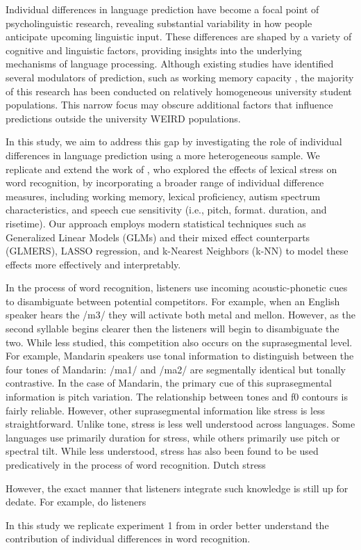 
Individual differences in language prediction have become a focal point of psycholinguistic research, revealing substantial variability in how people anticipate upcoming linguistic input. These differences are shaped by a variety of cognitive and linguistic factors, providing insights into the underlying mechanisms of language processing. Although existing studies have identified several modulators of prediction, such as working memory capacity \cite{Huettig2016,Li2023}, the majority of this research has been conducted on relatively homogeneous university student populations. This narrow focus may obscure additional factors that influence predictions outside the university WEIRD populations.

In this study, we aim to address this gap by investigating the role of individual differences in language prediction using a more heterogeneous sample. We replicate and extend the work of \citep{Sulpizio_McQueen_2012}, who explored the effects of lexical stress on word recognition, by incorporating a broader range of individual difference measures, including working memory, lexical proficiency, autism spectrum characteristics, and speech cue sensitivity (i.e., pitch, format. duration, and risetime). Our approach employs modern statistical techniques such as Generalized Linear Models (GLMs) and their mixed effect counterparts (GLMERS), LASSO regression, and k-Nearest Neighbors (k-NN) to model these effects more effectively and interpretably.

In the process of word recognition, listeners use incoming acoustic-phonetic cues to disambiguate between potential competitors. For example, when an English speaker hears the /m3/ they will activate both metal and mellon. However, as the second syllable begins clearer then the listeners will begin to disambiguate the two. While less studied, this competition also occurs on the suprasegmental level. For example, Mandarin speakers use tonal information to distinguish between the four tones of Mandarin: /ma1/ and /ma2/ are segmentally identical but tonally contrastive. 
In the case of Mandarin, the primary cue of this suprasegmental information is pitch variation. The relationship between tones and f0 contours is fairly reliable. However, other suprasegmental information like stress is less straightforward. Unlike tone, stress is less well understood across languages. Some languages use primarily duration for stress, while others primarily use pitch or spectral tilt. While less understood, stress has also been found to be used predicatively in the process of word recognition. Dutch stress   

However, the exact manner that listeners integrate such knowledge is still up for dedate. For example, do listeners \citep{Best_1995}


In this study we replicate experiment 1 from  in order better understand the contribution of individual differences in word recognition. 